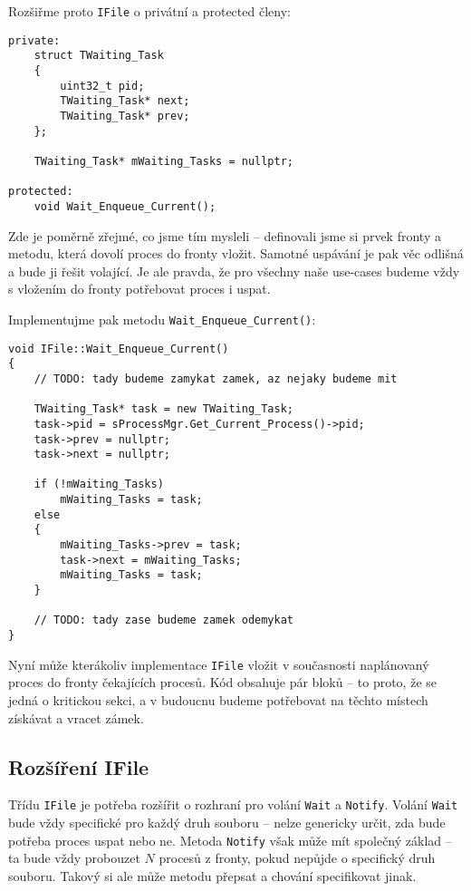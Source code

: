 \documentclass{article}
\begin{document}
Rozšiřme proto \texttt{IFile} o privátní a protected členy:
\begin{lstlisting}
private:
    struct TWaiting_Task
    {
        uint32_t pid;
        TWaiting_Task* next;
        TWaiting_Task* prev;
    };

    TWaiting_Task* mWaiting_Tasks = nullptr;
    
protected:
    void Wait_Enqueue_Current();
\end{lstlisting}

Zde je poměrně zřejmé, co jsme tím mysleli -- definovali jsme si prvek fronty a metodu, která dovolí proces do fronty vložit. Samotné uspávání je pak věc odlišná a bude ji řešit volající. Je ale pravda, že pro všechny naše use-cases budeme vždy s vložením do fronty potřebovat proces i uspat.

Implementujme pak metodu \texttt{Wait\_Enqueue\_Current()}:
\begin{lstlisting}
void IFile::Wait_Enqueue_Current()
{
    // TODO: tady budeme zamykat zamek, az nejaky budeme mit

    TWaiting_Task* task = new TWaiting_Task;
    task->pid = sProcessMgr.Get_Current_Process()->pid;
    task->prev = nullptr;
    task->next = nullptr;

    if (!mWaiting_Tasks)
        mWaiting_Tasks = task;
    else
    {
        mWaiting_Tasks->prev = task;
        task->next = mWaiting_Tasks;
        mWaiting_Tasks = task;
    }

    // TODO: tady zase budeme zamek odemykat
}
\end{lstlisting}

Nyní může kterákoliv implementace \texttt{IFile} vložit v současnosti naplánovaný proces do fronty čekajících procesů. Kód obsahuje pár  bloků -- to proto, že se jedná o kritickou sekci, a v budoucnu budeme potřebovat na těchto místech získávat a vracet zámek.

\subsection{Rozšíření IFile}

Třídu \texttt{IFile} je potřeba rozšířit o rozhraní pro volání \texttt{Wait} a \texttt{Notify}. Volání \texttt{Wait} bude vždy specifické pro každý druh souboru -- nelze genericky určit, zda bude potřeba proces uspat nebo ne. Metoda \texttt{Notify} však může mít společný základ -- ta bude vždy probouzet $N$ procesů z fronty, pokud nepůjde o specifický druh souboru. Takový si ale může metodu přepsat a chování specifikovat jinak.
\end{document}
